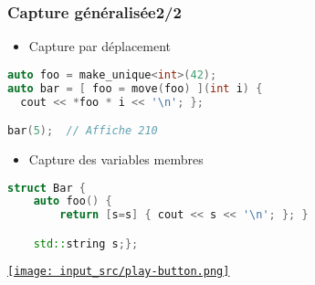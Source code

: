 \documentclass[C++.tex]{subfiles}
\begin{document}
\begin{frame}[fragile]
	\frametitle{Capture généralisée\titlehfill{}2/2}
	\begin{itemize}
		\item Capture par déplacement
	\end{itemize}
	
	\begin{lstlisting}[language=C++]
auto foo = make_unique<int>(42);
auto bar = [ foo = move(foo) ](int i) {
  cout << *foo * i << '\n'; };

bar(5);  // Affiche 210\end{lstlisting}

	\begin{itemize}
		\item Capture des variables membres
	\end{itemize}

	\begin{lstlisting}[language=C++]
struct Bar {
	auto foo() {
		return [s=s] { cout << s << '\n'; }; }

	std::string s;};\end{lstlisting}

	\hfill
	\href{https://godbolt.org/#g:!((g:!((g:!((h:codeEditor,i:(filename:'1',fontScale:14,fontUsePx:'0',j:1,lang:c%2B%2B,selection:(endColumn:16,endLineNumber:8,positionColumn:16,positionLineNumber:8,selectionStartColumn:16,selectionStartLineNumber:8,startColumn:16,startLineNumber:8),source:'%23include+%3Ciostream%3E%0A%23include+%3Cstring%3E%0A%0Ausing+namespace+std::literals%3B%0A%0Aint+main()%0A%7B%0A++int+foo+%3D+42%3B%0A%0A++auto+bar+%3D+%5B+%26x+%3D+foo+%5D()+%7B+--x%3B+%7D%3B%0A++bar()%3B%0A++std::cout+%3C%3C+foo+%3C%3C+!'%5Cn!'%3B%0A%0A++auto+baz+%3D+%5B+y+%3D+2*foo+%5D()+%7B+std::cout+%3C%3C+y+%3C%3C+!'%5Cn!'%3B+%7D%3B%0A++baz()%3B%0A%7D%0A'),l:'5',n:'0',o:'C%2B%2B+source+%231',t:'0')),k:50,l:'4',n:'0',o:'',s:0,t:'0'),(g:!((h:executor,i:(argsPanelShown:'1',compilationPanelShown:'0',compiler:g112,compilerOutShown:'0',execArgs:'',execStdin:'',fontScale:14,fontUsePx:'0',j:1,lang:c%2B%2B,libs:!((name:boost,ver:'175')),options:'-std%3Dc%2B%2B14',source:1,stdinPanelShown:'1',tree:'1',wrap:'0'),l:'5',n:'0',o:'Executor+x86-64+gcc+11.2+(C%2B%2B,+Editor+%231)',t:'0')),header:(),k:50,l:'4',n:'0',o:'',s:0,t:'0')),l:'2',n:'0',o:'',t:'0')),version:4}{\texttt{[image: input\_src/play-button.png]}}
\end{frame}
\end{document}
